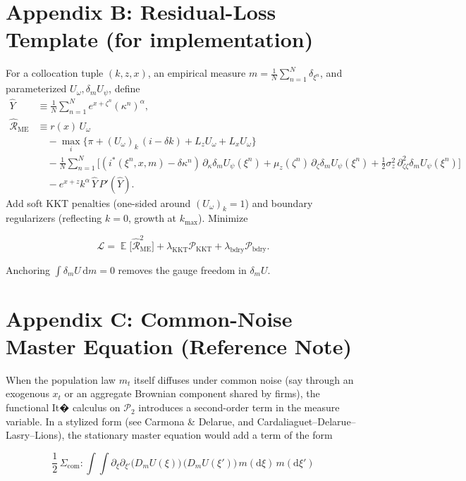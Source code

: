 ﻿\documentclass[11pt,letterpaper,oneside]{article}
\numberwithin{equation}{section}
\DeclareMathOperator{\E}{\mathbb{E}}
\newcommand{\1}{\mathbf{1}}
\newcommand{\diff}{\mathrm{d}}
\newcommand{\Lz}{L_z}
\newcommand{\Lx}{L_x}
\newcommand{\dmU}{\delta_m U}
\newcommand{\Dm}{D_m}
\begin{document}
\section{Appendix B: Residual-Loss Template (for implementation)}\label{app:loss}

For a collocation tuple $(k,z,x)$, an empirical measure $m=\tfrac1N\sum_{n=1}^N \delta_{\xi^n}$, and parameterized $U_\omega,\dmU_\psi$, define
\begin{align*}
\widehat{Y} &\equiv \frac{1}{N}\sum_{n=1}^N e^{x+\zeta^n}(\kappa^n)^\alpha,\\
\widehat{\mathcal{R}}_{\mathrm{ME}} &\equiv r(x)\,U_\omega\\
  &\quad - \max_{i}\Big\{ \pi + (U_{\omega})_k\,(i-\delta k) + \Lz U_{\omega} + \Lx U_{\omega} \Big\} \\
  &\quad - \frac{1}{N}\sum_{n=1}^N \Big[ (i^*(\xi^n,x,m)-\delta\kappa^n)\,\partial_{\kappa}\dmU_{\psi}(\xi^n)
    + \mu_z(\zeta^n)\,\partial_{\zeta}\dmU_{\psi}(\xi^n)
    + \tfrac12 \sigma_z^2\,\partial^2_{\zeta\zeta}\dmU_{\psi}(\xi^n) \Big] \\
  &\quad - e^{x+z}k^{\alpha}\,\widehat{Y}\,P'(\widehat{Y}).
  \end{align*}
  Add soft KKT penalties (one-sided around $(U_\omega)_k=1$) and boundary regularizers (reflecting $k=0$, growth at $k_{\max}$). Minimize

$$
\mathcal{L}=\E\big[\widehat{\mathcal{R}}_{\mathrm{ME}}^2\big]+\lambda_{\mathrm{KKT}}\mathcal{P}_{\mathrm{KKT}}
+\lambda_{\mathrm{bdry}}\mathcal{P}_{\mathrm{bdry}}.
$$

Anchoring $\int \dmU\,\diff m=0$ removes the gauge freedom in $\dmU$.

\section{Appendix C: Common-Noise Master Equation (Reference Note)}\label{app:common-noise}

When the population law $m_t$ itself diffuses under common noise (say through an exogenous $x_t$ or an aggregate Brownian component shared by firms), the functional It� calculus on $\mathcal P_2$ introduces a second-order term in the measure variable. In a stylized form (see Carmona \& Delarue, and Cardaliaguet--Delarue--Lasry--Lions), the stationary master equation would add a term of the form

$$
\frac{1}{2}\,\Sigma_{\mathrm{com}}:\!\int\!\!\int
\partial_{\xi}\partial_{\xi'} \big(\Dm U(\xi)\big)\,\big(\Dm U(\xi')\big)
\, m(\diff \xi)\, m(\diff \xi')
$$
\end{document}
